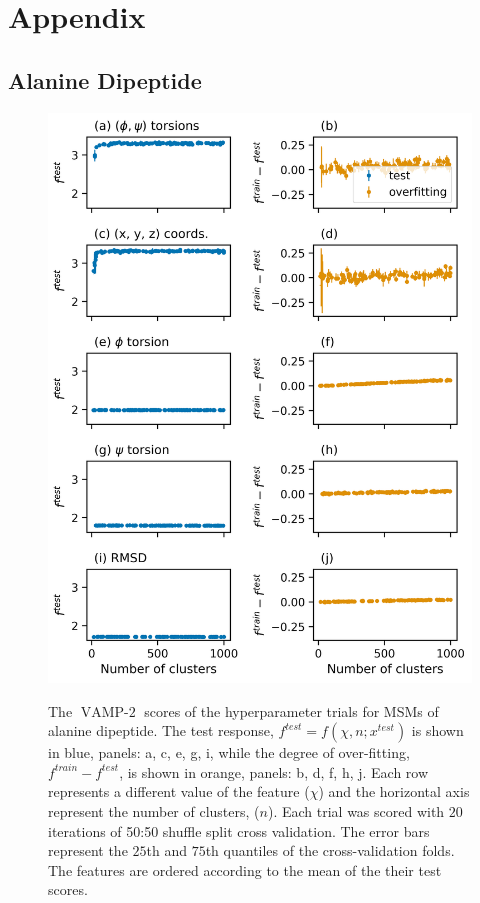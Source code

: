 \section{Appendix}\label{app:msm_opt}

\subsection{Alanine Dipeptide}

\begin{figure}[!ht]
    \centering
    \caption{The $\operatorname{VAMP-2}$ scores of the hyperparameter trials for MSMs of alanine dipeptide. The test response, $f^{test} = f(\chi, n; x^{test})$ is shown in blue, panels: a, c, e, g, i,  while the degree of over-fitting, $f^{train} - f^{test}$, is shown in orange, panels: b, d, f, h, j. Each row represents a different value of the feature ($\chi$) and the horizontal axis represent the number of clusters, ($n$). Each trial was scored with $20$ iterations of 50:50 shuffle split cross validation. The error bars represent the $25$th and $75$th quantiles of the cross-validation folds. 
    The features are ordered according to the mean of the their test scores.}
    \includegraphics[height=0.8\textheight]{chapters/msm_optimization/figures/ala1_train_test_results.png}
    \label{fig:ala1_train_test}
\end{figure}

